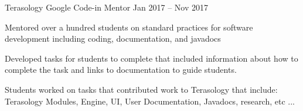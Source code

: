 \begin{cventries}
  \cventry
    {Terasology} %
    {Google Code-in Mentor} %
    {} %
    { Jan 2017 – Nov 2017} %
    {
      \begin{cvitems} %
        \item{Mentored over a hundred students on standard practices for software development including coding, documentation, and javadocs}
        \item {Developed tasks for students to complete that included information about how to complete the task and links to documentation to guide students. }
        \item {Students worked on tasks that contributed work to Terasology that include: Terasology Modules, Engine, UI, User Documentation, Javadocs, research, etc ...}
      \end{cvitems}
    }
    


\end{cventries}
